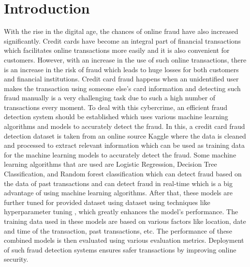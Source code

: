 \chapter{Introduction}
\label{ch:into} %

With the rise in the digital age, the chances of online fraud have also increased significantly. Credit cards have become an integral part of financial transactions which facilitates online transactions more easily and it is also convenient for customers. However, with an increase in the use of such online transactions, there is an increase in the risk of fraud which leads to huge losses for both customers and financial institutions. Credit card fraud happens when an unidentified user makes the transaction using someone else’s card information and detecting such fraud manually is a very challenging task due to such a high number of transactions every moment. To deal with this cybercrime, an efficient fraud detection system \citep{Dornadula-2019} should be established which uses various machine learning algorithms and models to accurately detect the fraud. In this, a credit card fraud detection dataset  is taken from an online source Kaggle where the data is cleaned and processed to extract relevant information which can be used as training data for the machine learning models to accurately detect the fraud. Some machine learning algorithms \citep{Shah-2023} that are used are Logistic Regression, Decision Tree Classification, and Random forest classification which can detect fraud based on the data of past transactions and can detect fraud in real-time which is a big advantage of using machine learning algorithms. After that, these models are further tuned for provided dataset using dataset using techniques like hyperparameter tuning \citep{Dalal-2022} , which greatly enhances the model's performance. The training data used in these models are based on various factors like location, date and time of the transaction, past transactions, etc. The performance of these combined models is then evaluated using various evaluation metrics. Deployment of such fraud detection systems ensures safer transactions by improving online security.





